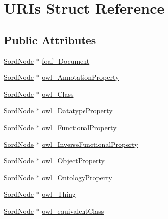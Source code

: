 \hypertarget{struct_u_r_is}{}\section{U\+R\+Is Struct Reference}
\label{struct_u_r_is}
\subsection*{Public Attributes}
\begin{DoxyCompactItemize}
\item 
\hyperlink{group__sord_ga804ac7d56d9fdea50f2d1e7278b1f82b}{Sord\+Node} $\ast$ \hyperlink{struct_u_r_is_ad8ec5f4fcd5f6f0815f2c56259fa6a38}{foaf\+\_\+\+Document}
\item 
\hyperlink{group__sord_ga804ac7d56d9fdea50f2d1e7278b1f82b}{Sord\+Node} $\ast$ \hyperlink{struct_u_r_is_a241d82f868548e389c404e5db1c26da2}{owl\+\_\+\+Annotation\+Property}
\item 
\hyperlink{group__sord_ga804ac7d56d9fdea50f2d1e7278b1f82b}{Sord\+Node} $\ast$ \hyperlink{struct_u_r_is_a2e626454715e4561b3e8cd2dec4d2554}{owl\+\_\+\+Class}
\item 
\hyperlink{group__sord_ga804ac7d56d9fdea50f2d1e7278b1f82b}{Sord\+Node} $\ast$ \hyperlink{struct_u_r_is_a68d1b2a1759e92c715864a306b70f557}{owl\+\_\+\+Datatype\+Property}
\item 
\hyperlink{group__sord_ga804ac7d56d9fdea50f2d1e7278b1f82b}{Sord\+Node} $\ast$ \hyperlink{struct_u_r_is_ae0ea879336aed35b375edf552e1fa593}{owl\+\_\+\+Functional\+Property}
\item 
\hyperlink{group__sord_ga804ac7d56d9fdea50f2d1e7278b1f82b}{Sord\+Node} $\ast$ \hyperlink{struct_u_r_is_a85a4d941c57e76ca42b1f4f5e6574b0c}{owl\+\_\+\+Inverse\+Functional\+Property}
\item 
\hyperlink{group__sord_ga804ac7d56d9fdea50f2d1e7278b1f82b}{Sord\+Node} $\ast$ \hyperlink{struct_u_r_is_a65ebce152bd968d0979552184e4444f1}{owl\+\_\+\+Object\+Property}
\item 
\hyperlink{group__sord_ga804ac7d56d9fdea50f2d1e7278b1f82b}{Sord\+Node} $\ast$ \hyperlink{struct_u_r_is_aa09a5a87299935a3d6629075055a90be}{owl\+\_\+\+Ontology\+Property}
\item 
\hyperlink{group__sord_ga804ac7d56d9fdea50f2d1e7278b1f82b}{Sord\+Node} $\ast$ \hyperlink{struct_u_r_is_ac807087d8be5f24f418efa63f5ee09e9}{owl\+\_\+\+Thing}
\item 
\hyperlink{group__sord_ga804ac7d56d9fdea50f2d1e7278b1f82b}{Sord\+Node} $\ast$ \hyperlink{struct_u_r_is_ac384c9e0565fa372f22ea6ca1f0f862f}{owl\+\_\+equivalent\+Class}

\end{DoxyCompactItemize}
